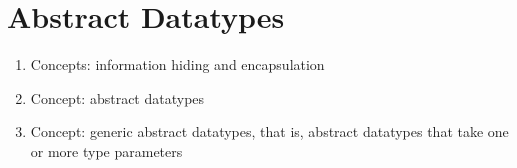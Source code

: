 \section{Abstract Datatypes}\label{sec:Abstract_Datatypes}

\begin{enumerate}[noitemsep]
\item Concepts: information hiding and encapsulation
\item Concept: abstract datatypes
\item Concept: generic abstract datatypes, that is, abstract datatypes that take one or more type parameters
\end{enumerate}

